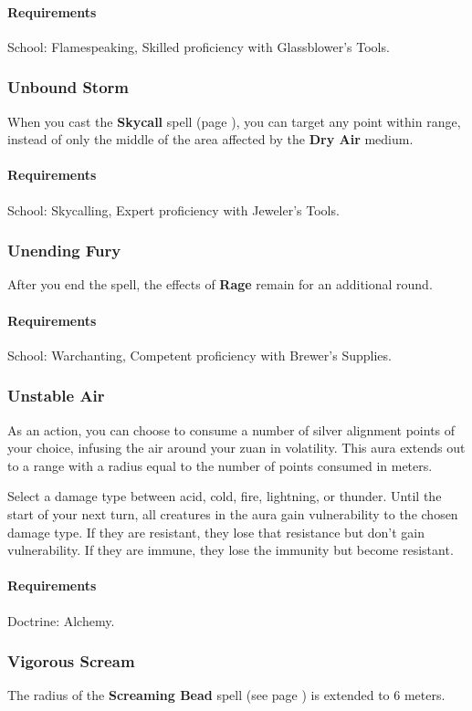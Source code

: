     \paragraph{Requirements} School: Flamespeaking, Skilled proficiency with Glassblower's Tools.
\subsubsection{Unbound Storm} \label{feat::unboundstorm}
    When you cast the \textbf{Skycall} spell (page \pageref{spell::skycall}), you can target any point within range, instead of only the middle of the area affected by the \textbf{Dry Air} medium.
    \paragraph{Requirements} School: Skycalling, Expert proficiency with Jeweler's Tools.
\subsubsection{Unending Fury} \label{feat::unendingfury}
    After you end the spell, the effects of \textbf{Rage} remain for an additional round.
    \paragraph{Requirements} School: Warchanting, Competent proficiency with Brewer's Supplies.
\subsubsection{Unstable Air} \label{feat::unstableair}
    As an action, you can choose to consume a number of silver alignment points of your choice, infusing the air around your zuan in volatility.
    This aura extends out to a range with a radius equal to the number of points consumed in meters.

    Select a damage type between acid, cold, fire, lightning, or thunder.
    Until the start of your next turn, all creatures in the aura gain vulnerability to the chosen damage type.
    If they are resistant, they lose that resistance but don't gain vulnerability.
    If they are immune, they lose the immunity but become resistant.
    \paragraph{Requirements} Doctrine: Alchemy.
\subsubsection{Vigorous Scream} \label{feat::vigorousscream}
    The radius of the \textbf{Screaming Bead} spell (see page \pageref{spell::screamingbead}) is extended to 6 meters.

